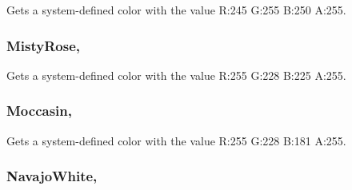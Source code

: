 Gets a system-\/defined color with the value R\+:245 G\+:255 B\+:250 A\+:255.

\hypertarget{structMicrosoft_1_1Xna_1_1Framework_1_1Color_aa47d4468d0d81bca05727d0f38a2c94e}{}
\subsubsection[{Misty\+Rose}]{ Misty\+Rose\hspace{0.3cm}{\ttfamily [static]}, {\ttfamily [get]}}\label{structMicrosoft_1_1Xna_1_1Framework_1_1Color_aa47d4468d0d81bca05727d0f38a2c94e}


Gets a system-\/defined color with the value R\+:255 G\+:228 B\+:225 A\+:255.

\hypertarget{structMicrosoft_1_1Xna_1_1Framework_1_1Color_a62f7f3a40f5204f089568b8bd89dd0cd}{}
\subsubsection[{Moccasin}]{ Moccasin\hspace{0.3cm}{\ttfamily [static]}, {\ttfamily [get]}}\label{structMicrosoft_1_1Xna_1_1Framework_1_1Color_a62f7f3a40f5204f089568b8bd89dd0cd}


Gets a system-\/defined color with the value R\+:255 G\+:228 B\+:181 A\+:255.

\hypertarget{structMicrosoft_1_1Xna_1_1Framework_1_1Color_a11c5534d2855eb0092ae14e8c789b0d4}{}
\subsubsection[{Navajo\+White}]{ Navajo\+White\hspace{0.3cm}{\ttfamily [static]}, {\ttfamily [get]}}\label{structMicrosoft_1_1Xna_1_1Framework_1_1Color_a11c5534d2855eb0092ae14e8c789b0d4}



